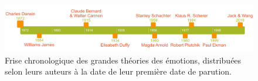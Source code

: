 \begin{figure}[h]
  \centering
  \includegraphics[width=16cm]{./Chapitre1/figures/friseHisto.png}
  \caption{Frise chronologique des grandes théories des émotions, distribuées selon leurs auteurs à la date de leur première date de parution.}
  \label{fig:friseHisto}
\end{figure}
